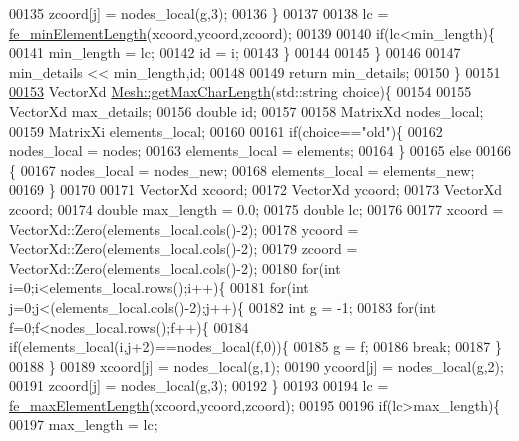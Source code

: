 \begin{DoxyCode}
00135             zcoord[j] = nodes\_local(g,3);
00136         \}
00137 
00138         lc = \hyperlink{functions_8h_a6b04cfa4d2533eed9667ae14f361baa6}{fe\_minElementLength}(xcoord,ycoord,zcoord);
00139 
00140         \textcolor{keywordflow}{if}(lc<min\_length)\{
00141             min\_length = lc;
00142             \textcolor{keywordtype}{id} = i;
00143         \}
00144 
00145     \}
00146 
00147     min\_details << min\_length,id;
00148 
00149     \textcolor{keywordflow}{return} min\_details;
00150 \}
00151 
\hyperlink{class_mesh_a72d2a3863b85a2a2aed7deca8ce37832}{00153} VectorXd \hyperlink{class_mesh_a72d2a3863b85a2a2aed7deca8ce37832}{Mesh::getMaxCharLength}(std::string choice)\{
00154 
00155     VectorXd max\_details;
00156     \textcolor{keywordtype}{double} id;
00157 
00158     MatrixXd nodes\_local;
00159     MatrixXi elements\_local;
00160 
00161     \textcolor{keywordflow}{if}(choice==\textcolor{stringliteral}{"old"})\{
00162         nodes\_local = nodes;
00163         elements\_local = elements;
00164     \}
00165     \textcolor{keywordflow}{else}
00166     \{
00167         nodes\_local = nodes\_new;
00168         elements\_local = elements\_new;
00169     \}
00170 
00171     VectorXd xcoord;
00172     VectorXd ycoord;
00173     VectorXd zcoord;
00174     \textcolor{keywordtype}{double} max\_length = 0.0;
00175     \textcolor{keywordtype}{double} lc;
00176 
00177     xcoord = VectorXd::Zero(elements\_local.cols()-2);
00178     ycoord = VectorXd::Zero(elements\_local.cols()-2);
00179     zcoord = VectorXd::Zero(elements\_local.cols()-2);
00180     \textcolor{keywordflow}{for}(\textcolor{keywordtype}{int} i=0;i<elements\_local.rows();i++)\{
00181         \textcolor{keywordflow}{for}(\textcolor{keywordtype}{int} j=0;j<(elements\_local.cols()-2);j++)\{
00182             \textcolor{keywordtype}{int} g = -1;
00183             \textcolor{keywordflow}{for}(\textcolor{keywordtype}{int} f=0;f<nodes\_local.rows();f++)\{
00184                 \textcolor{keywordflow}{if}(elements\_local(i,j+2)==nodes\_local(f,0))\{
00185                     g = f;
00186                     \textcolor{keywordflow}{break};
00187                 \}
00188             \}
00189             xcoord[j] = nodes\_local(g,1);
00190             ycoord[j] = nodes\_local(g,2);
00191             zcoord[j] = nodes\_local(g,3);
00192         \}
00193 
00194         lc = \hyperlink{functions_8h_aa11bdbf370d88d267313624c85c28e70}{fe\_maxElementLength}(xcoord,ycoord,zcoord);
00195 
00196         \textcolor{keywordflow}{if}(lc>max\_length)\{
00197             max\_length = lc;

\end{DoxyCode}
